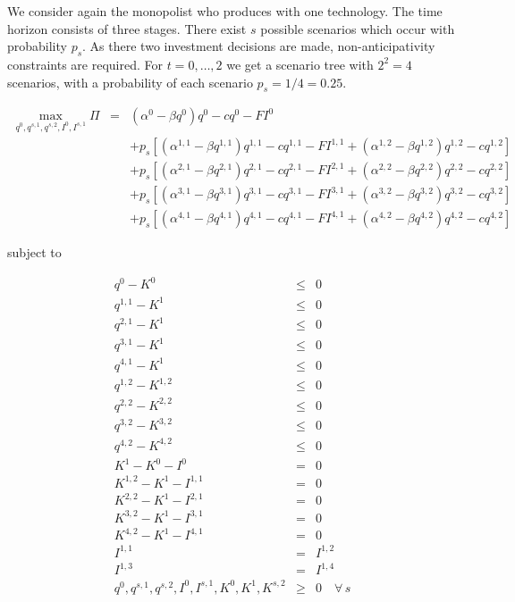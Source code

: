 \documentclass[11pt,a4paper]{article}
\begin{document}
We consider again the monopolist who produces with one technology. The time horizon consists of three stages. There exist $s$ possible scenarios which occur with probability $p_s$. As there two investment decisions are made, non-anticipativity constraints are required. For $t=0,\dots,2$ we get a scenario tree with $2^2=4$ scenarios, with a probability of each scenario $p_s=1/4=0.25$.

\begin{eqnarray*}
	\max_{q^0,q^{s,1},q^{s,2},I^0,I^{s,1}}\Pi &=& (\alpha^0-\beta q^0)q^0 - cq^0 -FI^0  \\
        && + p_s\left[(\alpha^{1,1}-\beta q^{1,1})q^{1,1} - cq^{1,1} - FI^{1,1} + (\alpha^{1,2}-\beta q^{1,2})q^{1,2} - cq^{1,2}\right] \\
        && + p_s\left[(\alpha^{2,1}-\beta q^{2,1})q^{2,1} - cq^{2,1} - FI^{2,1} + (\alpha^{2,2}-\beta q^{2,2})q^{2,2} - cq^{2,2}\right] \\
        && + p_s\left[(\alpha^{3,1}-\beta q^{3,1})q^{3,1} - cq^{3,1} - FI^{3,1} + (\alpha^{3,2}-\beta q^{3,2})q^{3,2} - cq^{3,2}\right] \\
        && + p_s\left[(\alpha^{4,1}-\beta q^{4,1})q^{4,1} - cq^{4,1} - FI^{4,1} + (\alpha^{4,2}-\beta q^{4,2})q^{4,2} - cq^{4,2}\right] 
\end{eqnarray*}

subject to

\begin{eqnarray*}
	q^0 - K^0 &\leq& 0\\
	q^{1,1} - K^{1} &\leq& 0\\
        q^{2,1} - K^{1} &\leq& 0\\
        q^{3,1} - K^{1} &\leq& 0\\
        q^{4,1} - K^{1} &\leq& 0\\
	q^{1,2} - K^{1,2} &\leq& 0\\
	q^{2,2} - K^{2,2} &\leq& 0\\
	q^{3,2} - K^{3,2} &\leq& 0\\
	q^{4,2} - K^{4,2} &\leq& 0\\
        K^{1} - K^0 - I^0 &=& 0\\
        K^{1,2} - K^1 - I^{1,1} &=& 0\\
        K^{2,2} - K^1 - I^{2,1} &=& 0\\
        K^{3,2} - K^1 - I^{3,1} &=& 0\\
        K^{4,2} - K^1 - I^{4,1} &=& 0\\
        I^{1,1} &=& I^{1,2} \\
        I^{1,3} &=& I^{1,4} \\
	q^0,q^{s,1},q^{s,2},I^0,I^{s,1},K^0,K^{1},K^{s,2} &\geq& 0\quad\forall\, s 
\end{eqnarray*}
 
\end{document}

